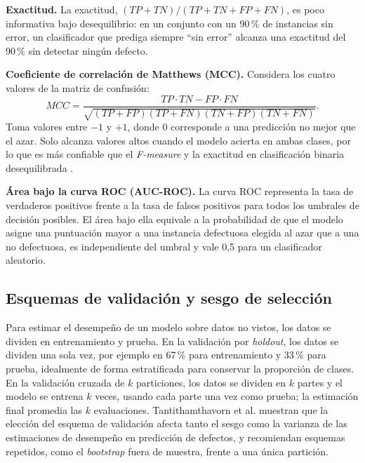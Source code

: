 \textbf{Exactitud.} La exactitud, $(TP+TN)/(TP+TN+FP+FN)$, es poco informativa bajo desequilibrio: en un conjunto con un 90\,\% de instancias sin error, un clasificador que prediga siempre ``sin error'' alcanza una exactitud del 90\,\% sin detectar ningún defecto.

\textbf{Coeficiente de correlación de Matthews (MCC).} Considera los cuatro valores de la matriz de confusión:
\begin{equation}
MCC = \frac{TP \cdot TN - FP \cdot FN}{\sqrt{(TP+FP)(TP+FN)(TN+FP)(TN+FN)}}.
\label{eq:mcc}
\end{equation}
Toma valores entre $-1$ y $+1$, donde 0 corresponde a una predicción no mejor que el azar. Solo alcanza valores altos cuando el modelo acierta en ambas clases, por lo que es más confiable que el \textit{F-measure} y la exactitud en clasificación binaria desequilibrada \cite{chicco2020}.

\textbf{Área bajo la curva ROC (AUC-ROC).} La curva ROC representa la tasa de verdaderos positivos frente a la tasa de falsos positivos para todos los umbrales de decisión posibles. El área bajo ella equivale a la probabilidad de que el modelo asigne una puntuación mayor a una instancia defectuosa elegida al azar que a una no defectuosa, es independiente del umbral y vale 0,5 para un clasificador aleatorio.

\subsection{Esquemas de validación y sesgo de selección}

Para estimar el desempeño de un modelo sobre datos no vistos, los datos se dividen en entrenamiento y prueba. En la validación por \textit{holdout}, los datos se dividen una sola vez, por ejemplo en 67\,\% para entrenamiento y 33\,\% para prueba, idealmente de forma estratificada para conservar la proporción de clases. En la validación cruzada de $k$ particiones, los datos se dividen en $k$ partes y el modelo se entrena $k$ veces, usando cada parte una vez como prueba; la estimación final promedia las $k$ evaluaciones. Tantithamthavorn et al. \cite{tantithamthavorn2017} muestran que la elección del esquema de validación afecta tanto el sesgo como la varianza de las estimaciones de desempeño en predicción de defectos, y recomiendan esquemas repetidos, como el \textit{bootstrap} fuera de muestra, frente a una única partición.


